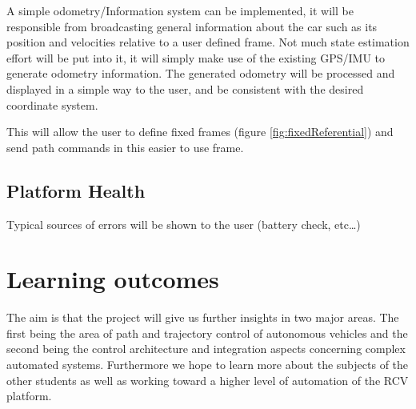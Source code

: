 \documentclass{article}
\begin{document}
A simple odometry/Information system can be implemented, it will be responsible from broadcasting general information about the car such as its position and velocities relative to a user defined frame.
Not much state estimation effort will be put into it, it will simply make use of the existing GPS/IMU to generate odometry information. 
The generated odometry will be processed and displayed in a simple way to the user, and be consistent with the desired coordinate system.

This will allow the user to define fixed frames (figure \ref{fig:fixedReferential}) and send path commands in this easier to use frame.

 
 

\subsection{Platform Health}

Typical sources of errors will be shown to the user (battery check, etc…)

\section{Learning outcomes}
The aim is that the project will give us further insights in two major areas. The first being the area of path and trajectory control of autonomous vehicles and the second being the control architecture and integration aspects concerning complex automated systems. Furthermore we hope to learn more about the subjects of the other students as well as working toward a higher level of automation of the RCV platform.
   
\end{document}
